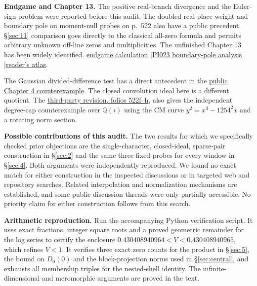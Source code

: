 \documentclass[11pt,reqno]{amsart}
\numberwithin{equation}{section}
\newcommand{\Q}{\mathbb Q}\newcommand{\R}{\mathbb R}\newcommand{\C}{\mathbb C}\newcommand{\Z}{\mathbb Z}
\begin{document}
\textbf{Endgame and Chapter 13.} The positive real-branch divergence and the Euler-sign problem were reported before this audit. The doubled real-place weight and boundary pole on moment-null probes on p.~522 also have a public precedent. \S\ref{sec:11} comparison goes directly to the classical all-zero formula and permits arbitrary unknown off-line zeros and multiplicities. The unfinished Chapter 13 has been widely identified. \href{https://github.com/mccorvie/riemann-masullo/issues/3\#issuecomment-7048799269}{endgame calculation} \enspace|\enspace \href{https://github.com/monocap-tech/weil-lab/blob/2f94e280ac7bf3a567f7d4ca54898551d867a4f6/docs/PI023_CANONICAL_HAAR_AND_BOUNDARY_POLE_NO_GO.md}{PI023 boundary-pole analysis} \enspace|\enspace \href{https://rlankenau.github.io/rh/masullo/}{reader's atlas}.

The Gaussian divided-difference test has a direct antecedent in the \href{https://github.com/mccorvie/riemann-masullo/issues/36\#issuecomment-7058116453}{public Chapter 4 counterexample}. The closed convolution ideal here is a different quotient. The \href{https://github.com/Titulus233/The-Music-of-the-Primes-Revise/blob/4a9ad5765d4a2dfb237f874695ee4f4a07817867/src/the-music-of-the-primes-revised.tex}{third-party revision, folios 522f--h}, also gives the independent degree-cap counterexample over \(\Q(i)\) using the CM curve \(y^2=x^3-1254^2x\) and a rotating norm section.

\textbf{Possible contributions of this audit.} The two results for which we specifically checked prior objections are the single-character, closed-ideal, sparse-pair construction in \S\ref{sec:2} and the same three fixed probes for every window in \S\ref{sec:4}. Both arguments were independently reproduced. We found no exact match for either construction in the inspected discussions or in targeted web and repository searches. Related interpolation and normalization mechanisms are established, and some public discussion threads were only partially accessible. No priority claim for either construction follows from this search.

\textbf{Arithmetic reproduction.} Run the accompanying Python verification script. It uses exact fractions, integer square roots and a proved geometric remainder for the log series to certify the enclosure \(0.430408940964<V<0.430408940965\), which refines \(V<1\). It verifies three exact zero counts for the product in \S\ref{sec:5}, the bound on \(D_0(0)\) and the block-projection norms used in \S\ref{sec:central}, and exhausts all membership triples for the nested-shell identity. The infinite-dimensional and meromorphic arguments are proved in the text.
\end{document}
